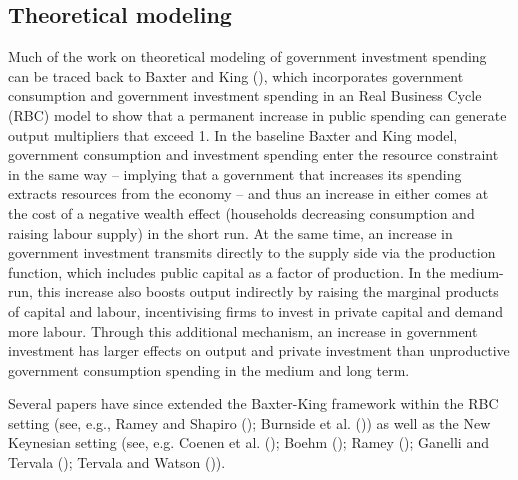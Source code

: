 \documentclass[titlepage, 11pt, a4paper]{article}
\renewcommand{\&}{and}
\begin{document}
\subsection{Theoretical modeling}
Much of the work on theoretical modeling of government investment spending can be traced back to Baxter and King (\citeyear{baxter1993fiscal}), which incorporates government consumption and government investment spending in an Real Business Cycle (RBC) model to show that a permanent increase in public spending can generate output multipliers that exceed 1. In the baseline Baxter and King model, government consumption and investment spending enter the resource constraint in the same way – implying that a government that increases its spending extracts resources from the economy – and thus an increase in either comes at the cost of a negative wealth effect (households decreasing consumption and raising labour supply) in the short run.
At the same time, an increase in government investment transmits directly to the supply side via the production function, which includes public capital as a factor of production. In the medium-run, this increase also boosts output indirectly by raising the marginal products of capital and labour, incentivising firms to invest in private capital and demand more labour. Through this additional mechanism, an increase in government investment has larger effects on output and private investment than unproductive government consumption spending in the medium and long term. 

Several papers have since extended the Baxter-King framework within the RBC setting (see, e.g., Ramey and Shapiro (\citeyear{ramey1998costly}); Burnside et al. (\citeyear{burnside2004fiscal})) as well as the New Keynesian setting (see, e.g. Coenen et al. (\citeyear{coenen2012effects}); Boehm (\citeyear{boehm2020government}); Ramey (\citeyear{ramey2020macroeconomic}); Ganelli and Tervala (\citeyear{ganelli2020welfare}); Tervala and Watson (\citeyear{tervala2022hysteresis})).

\end{document}
